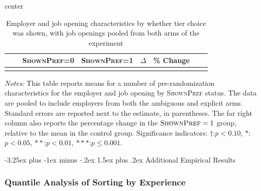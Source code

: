 \documentclass[12pt]{article}
\makeatletter
\renewcommand{\subsection}{%
  \@startsection{subsection}{2}{\z@}%
  {-3.25ex plus -1ex minus -.2ex}%
  {1.5ex plus .2ex}%
  {\normalfont\large\bfseries}%
}
\newcommand{\starlanguage}{Significance indicators: $\dagger$:$p < 0.10$, $*$:$p < 0.05$, $**$:$p < 0.01$, $***$:$p \le 0.001$.}
\makeatother
\begin{document}
\begin{table}[h!]
\begin{center}
\caption{Employer and job opening characteristics by whether tier choice was shown, with job openings pooled from both arms of the experiment}
\label{tab:balance_big}
\begin{small}
\begin{adjustbox}{center}
\begin{tabular}{lllccccc}
\toprule
&   & \multicolumn{1}{c}{\parbox[t][][t]{2.3cm}{{\footnotesize \textsc{ShownPref}=0}}}
&     \multicolumn{1}{c}{\parbox[t][][t]{2.3cm}{\footnotesize  \textsc{ShownPref=1}}}
&     \multicolumn{1}{c}{\parbox[t][][t]{2.0cm}{$\Delta$}}
&     \multicolumn{1}{c}{\parbox[t][][t]{1cm}{\% Change}}
\\
\hline

 \\
\bottomrule
\end{tabular}
\end{adjustbox}
\end{small}
\end{center}
\begin{minipage}{1.0 \textwidth}
\begin{footnotesize}
\begin{singlespace}
  \emph{Notes:} This table reports means for a number of pre-randomization characteristics for the employer and job opening by \textsc{ShownPref} status.
  The data are pooled to include employers from both the ambiguous and explicit arms.
Standard errors are reported next to the estimate, in parentheses.
The far right column also reports the percentage change in the $\textsc{ShownPref}=1$ group, relative to the mean in the control group. 
\starlanguage
\end{singlespace}
\end{footnotesize}
\end{minipage}
\end{table}




\subsection{Additional Empirical Results}\label{online_app:additional_empirical}



\subsubsection{Quantile Analysis of Sorting by Experience}
\label{online_app:empirical_analysis}
\end{document}
